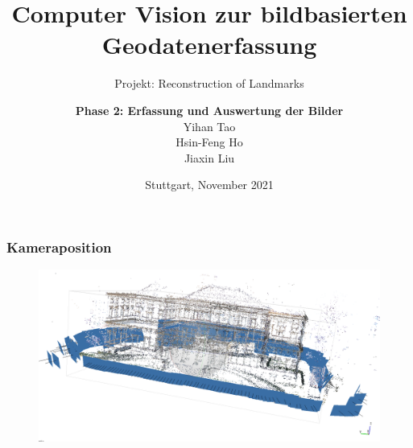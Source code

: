 \documentclass{beamer}
\title[Phase 2: Erfassung und Auswertung] %
{Computer Vision zur bildbasierten Geodatenerfassung}
\subtitle{Projekt: Reconstruction of Landmarks}
\author[Projekt: Reconstruction of Landmarks] %
{ \Large\textbf{Phase 2: Erfassung und Auswertung der Bilder}
	\\[10mm]
	\small Yihan Tao\\
	Hsin-Feng Ho\\
	Jiaxin Liu}
\date[] %
{Stuttgart, November 2021}
\begin{document}
	
	\frame[plain]{\titlepage}
	
	
	
	
	
	\begin{frame}\vspace{20pt}

		\frametitle{Kameraposition}
		\vspace{-10pt}
		\begin{figure}[r]
		\includegraphics[width=12cm]{align photos}
		\end{figure}
	\end{frame}
	
\end{document}

